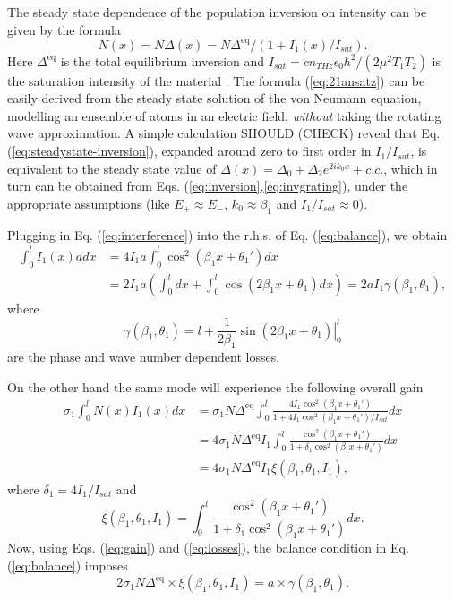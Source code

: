\documentclass[preprint,secnumarabic,amssymb, nobibnotes, aip, prd]{revtex4-1}
\begin{document}
The steady state dependence of the population inversion on intensity can be given by the formula 
\begin{equation}
\label{eq:steadystate-inversion}
N(x) = N\Delta(x) = N\Delta^{\text{eq}}/(1+I_1(x)/I_{sat}).
\end{equation} 
Here $\Delta^{\text{eq}}$ is the total equilibrium inversion and $I_{sat} = cn_{THz} \epsilon_0 \hbar^2 /(2\mu^2T_1T_2)$ is the saturation intensity of the material \cite{siegman1986lasers}. The formula (\ref{eq:21ansatz}) can be easily derived from the steady state solution of the von Neumann equation, modelling an ensemble of atoms in an electric field, \emph{without} taking the rotating wave approximation. A simple calculation SHOULD (CHECK) reveal that Eq. (\ref{eq:steadystate-inversion}), expanded around zero to first order in $I_1/I_{sat}$, is equivalent to the steady state value of $\Delta(x) =\Delta_0 + \Delta_2e^{2ik_0 x} + c.c.$, which in turn can be obtained from Eqs. (\ref{eq:inversion},\ref{eq:invgrating}), under the appropriate assumptions (like $E_+\approx E_-$, $k_0 \approx \beta_1$ and $I_1/I_{sat} \approx 0$).  

Plugging in Eq. (\ref{eq:interference}) into the r.h.s. of Eq. (\ref{eq:balance}), we obtain 
\begin{align}
\label{eq:losses}
\int_{0}^{l}I_1(x)adx &= 4I_1a\int_{0}^{l}\cos^2(\beta_1 x+\theta_1')dx \nonumber \\ 
&=  2I_1a \left(\int_{0}^{l}dx + \int_{0}^{l}\cos(2\beta_1 x+\theta_1)dx\right) = 2 a I_1 \gamma(\beta_1,\theta_1),
\end{align}
where 
\begin{equation}
\label{eq:gamma-beta-teta}
\gamma(\beta_1,\theta_1) = l+\frac{1}{2\beta_1}\left. \sin(2\beta_1x+\theta_1) \right|_{0}^{l}
\end{equation}
are the phase and wave number dependent losses. 

On the other hand the same mode will experience the following overall gain
\begin{align}
\label{eq:gain}
\sigma_1\int_{0}^{l} N(x)I_1(x)dx &= \sigma_1 N \Delta^{\text{eq}} \int_{0}^{l}\frac{4I_1\cos^2(\beta_1 x+\theta_1')}{1+4I_1\cos^2(\beta_1 x+\theta_1')/I_{sat}}dx \nonumber \\ 
&= 4\sigma_1 N \Delta^{\text{eq}} I_1 \int_{0}^{l} \frac{\cos^2(\beta_1 x+\theta_1')}{1+\delta_1\cos^2(\beta_1 x+\theta_1')} dx  \nonumber \\ 
&=4\sigma_1 N \Delta^{\text{eq}} I_1 \xi(\beta_1,\theta_1,I_1),
\end{align}
where $\delta_1 = 4I_1/I_{sat}$ and
\begin{equation}
\label{eq:xi-beta-teta-I}
\xi(\beta_1,\theta_1,I_1) = \int_{0}^{l} \frac{\cos^2(\beta_1 x+\theta_1')}{1+\delta_1\cos^2(\beta_1 x+\theta_1')} dx.
\end{equation}
Now, using Eqs. (\ref{eq:gain}) and (\ref{eq:losses}), the balance condition in Eq. (\ref{eq:balance}) imposes 
\begin{equation}
\label{eq:balance-02}
2\sigma_1 N \Delta^{\text{eq}} \times \xi(\beta_1,\theta_1,I_1) = a\times \gamma(\beta_1,\theta_1).
\end{equation}
\end{document}
